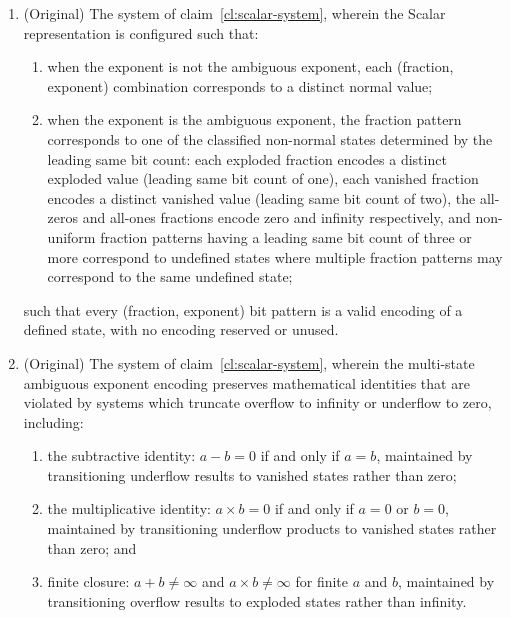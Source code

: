 \documentclass[12pt,letter]{article}
\begin{document}
\begin{enumerate}
    \item (Original) The system of claim~\ref{cl:scalar-system}, wherein the Scalar representation is configured such that:
          \begin{enumerate}
              \item when the exponent is not the ambiguous exponent, each (fraction, exponent) combination corresponds to a distinct normal value;
              \item when the exponent is the ambiguous exponent, the fraction pattern corresponds to one of the classified non-normal states determined by the leading same bit count: each exploded fraction encodes a distinct exploded value (leading same bit count of one), each vanished fraction encodes a distinct vanished value (leading same bit count of two), the all-zeros and all-ones fractions encode zero and infinity respectively, and non-uniform fraction patterns having a leading same bit count of three or more correspond to undefined states where multiple fraction patterns may correspond to the same undefined state;
          \end{enumerate}
          such that every (fraction, exponent) bit pattern is a valid encoding of a defined state, with no encoding reserved or unused.

    \item (Original) The system of claim~\ref{cl:scalar-system}, wherein the multi-state ambiguous exponent encoding preserves mathematical identities that are violated by systems which truncate overflow to infinity or underflow to zero, including:
          \begin{enumerate}
              \item the subtractive identity: $a - b = 0$ if and only if $a = b$, maintained by transitioning underflow results to vanished states rather than zero;
              \item the multiplicative identity: $a \times b = 0$ if and only if $a = 0$ or $b = 0$, maintained by transitioning underflow products to vanished states rather than zero; and
              \item finite closure: $a + b \neq \infty$ and $a \times b \neq \infty$ for finite $a$ and $b$, maintained by transitioning overflow results to exploded states rather than infinity.
          \end{enumerate}


\end{enumerate}
\end{document}
